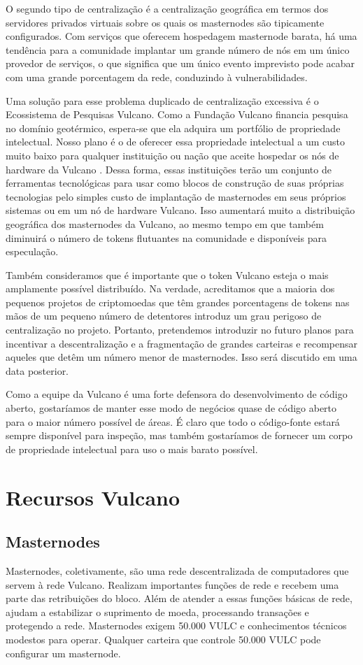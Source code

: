 \documentclass[A4paper, 12pt]{article}
\begin{document}
O segundo tipo de centralização é a centralização geográfica em termos dos servidores privados virtuais sobre os quais os masternodes são tipicamente configurados. Com serviços que oferecem hospedagem masternode barata, há uma tendência para a comunidade implantar um grande número de nós em um único provedor de serviços, o que significa que um único evento imprevisto pode acabar com uma grande porcentagem da rede, conduzindo à vulnerabilidades.

Uma solução para esse problema duplicado de centralização excessiva é o Ecossistema de Pesquisas Vulcano. Como a Fundação Vulcano financia pesquisa no domínio geotérmico, espera-se que ela adquira um portfólio de propriedade intelectual. Nosso plano é o de oferecer essa propriedade intelectual a um custo muito baixo para qualquer instituição ou nação que aceite hospedar os nós de hardware da Vulcano .   Dessa forma, essas instituições terão um conjunto de ferramentas tecnológicas para usar como blocos de construção de suas próprias tecnologias pelo simples custo de implantação de masternodes em seus próprios sistemas ou em um nó de hardware Vulcano. Isso aumentará muito a distribuição geográfica dos masternodes da Vulcano, ao mesmo tempo em que também diminuirá o número de tokens flutuantes na comunidade e disponíveis para especulação.

Também consideramos que é importante que o token Vulcano esteja o mais amplamente possível distribuído. Na verdade, acreditamos que a maioria dos pequenos projetos de criptomoedas que têm grandes porcentagens de tokens nas mãos de um pequeno número de detentores introduz um grau perigoso de centralização no projeto. Portanto, pretendemos introduzir no futuro planos para incentivar a descentralização e a fragmentação de grandes carteiras e recompensar aqueles que detêm um número menor de masternodes. Isso será discutido em uma data posterior.

Como a equipe da Vulcano é uma forte defensora do desenvolvimento de código aberto, gostaríamos de manter esse modo de negócios quase de código aberto para o maior número possível de áreas. É claro que todo o código-fonte estará sempre disponível para inspeção, mas também gostaríamos de fornecer um corpo de propriedade intelectual para uso o mais barato possível.

\section{Recursos Vulcano}
\subsection {Masternodes}
Masternodes, coletivamente, são uma rede descentralizada de computadores que servem à rede Vulcano. Realizam importantes funções de rede e recebem uma parte das retribuições do bloco.  Além de atender a essas funções básicas de rede, ajudam a estabilizar o suprimento de moeda, processando transações e protegendo a rede. Masternodes exigem 50.000 VULC e conhecimentos técnicos modestos para operar. Qualquer carteira que controle 50.000 VULC pode configurar um masternode.
\end{document}
